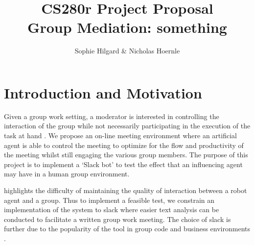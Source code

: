 \documentclass[final,authoryear,11pt,times]{elsarticle}
\begin{document}
\begin{frontmatter}

\title{CS280r Project Proposal \\ Group Mediation: something}


\author{Sophie Hilgard \& Nicholas Hoernle}


\end{frontmatter}

\section{Introduction and Motivation}
	\label{sec:introduction-motivation}
	Given a group work setting, a moderator is interested in controlling the interaction of the group while not necessarily participating in the execution of the task at hand \citep{short2015towards}. We propose an on-line meeting environment where an artificial agent is able to control the meeting to optimize for the flow and productivity of the meeting whilst still engaging the various group members. The purpose of this project is to implement a `Slack bot' to test the effect that an influencing agent may have in a human group environment.

	\citet{matsuyama2015four} highlights the difficulty of maintaining the quality of interaction between a robot agent and a group. Thus to implement a feasible test, we constrain an implementation of the system to slack where easier text analysis can be conducted to facilitate a written group work meeting. The choice of slack is further due to the popularity of the tool in group code and business environments \citep{jeffrey2016scientists}\citep{lebeuf2017software}.
\end{document}
